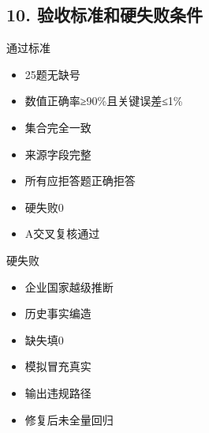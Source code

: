 \documentclass[UTF8,openany,zihao=-4]{ctexbook}
\renewcommand{\_}{\textunderscore\allowbreak}
\begin{document}
\subsection*{10. 验收标准和硬失败条件}
\begin{statusbox}{通过标准}
\begin{itemize}[label=$\square$]
\item 25题无缺号
\item 数值正确率≥90\%且关键误差≤1\%
\item 集合完全一致
\item 来源字段完整
\item 所有应拒答题正确拒答
\item 硬失败0
\item A交叉复核通过
\end{itemize}
\end{statusbox}
\begin{dangerbox}{硬失败}
\begin{itemize}
\item 企业国家越级推断
\item 历史事实编造
\item 缺失填0
\item 模拟冒充真实
\item 输出违规路径
\item 修复后未全量回归
\end{itemize}
\end{dangerbox}
\end{document}

